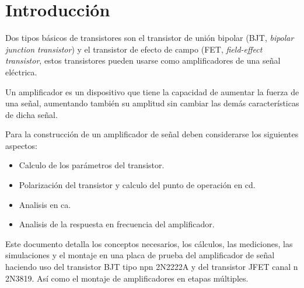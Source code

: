 \section{Introducción}
Dos tipos básicos de transistores son el transistor de unión bipolar (BJT,
\emph{bipolar junction transistor}) y el transistor de efecto de campo (FET,
\emph{field-effect transistor}, estos transistores pueden usarse como
amplificadores de una señal eléctrica.

Un amplificador es un dispositivo que tiene la capacidad de aumentar la fuerza
de una señal, aumentando también su amplitud sin cambiar las demás
características de dicha señal.

Para la construcción de un amplificador de señal deben considerarse los
siguientes aspectos:

\begin{itemize}
    \item Calculo de los parámetros del transistor.
    \item Polarización del transistor y calculo del punto de operación en cd.
    \item Analisis en ca.
    \item Analisis de la respuesta en frecuencia del amplificador.
\end{itemize}

Este documento detalla los conceptos necesarios, los cálculos, las mediciones,
las simulaciones y el montaje en una placa de prueba del amplificador de señal
haciendo uso del transistor BJT tipo npn 2N2222A y del transistor JFET canal n
2N3819. Así como el montaje de amplificadores en etapas múltiples.

